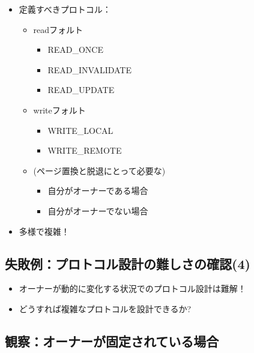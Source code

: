 \documentclass[25pt,landscape,papersize]{jsarticle}
\begin{document}
\begin{itemize}
\item 定義すべきプロトコル：
  \begin{itemize}
  \item readフォルト
    \begin{itemize}
    \item READ\_ONCE
    \item READ\_INVALIDATE
    \item READ\_UPDATE
    \end{itemize}
  \item writeフォルト
    \begin{itemize}
    \item WRITE\_LOCAL
    \item WRITE\_REMOTE
    \end{itemize}
  \item (ページ置換と脱退にとって必要な)
    \begin{itemize}
    \item 自分がオーナーである場合
    \item 自分がオーナーでない場合
    \end{itemize}
  \end{itemize}
\item 多様で複雑！
\end{itemize}


\subsection{失敗例：プロトコル設計の難しさの確認(4)}



\begin{itemize}
\item オーナーが動的に変化する状況でのプロトコル設計は難解！
\item どうすれば複雑なプロトコルを設計できるか?
\end{itemize}

\subsection{観察：オーナーが固定されている場合}
\end{document}
